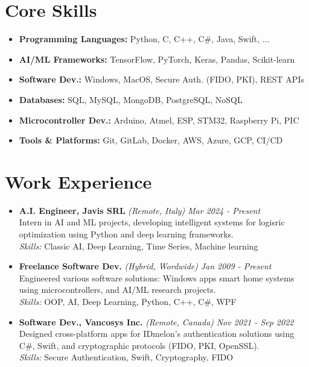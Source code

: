 \documentclass[a4paper]{article}
\begin{document}
\begin{paracol}{2}
\section*{Core Skills}
\begin{itemize}[left=0pt]
\setlength\itemsep{-0.3em}
    \item \textbf{Programming Languages:} Python, C, C++, C\#, Java, Swift, ...
    \item \textbf{AI/ML Frameworks:} TensorFlow, PyTorch, Keras, Pandas, Scikit-learn
    \item \textbf{Software Dev.:} Windows, MacOS, Secure Auth. (FIDO, PKI), REST APIs
    \item \textbf{Databases:} SQL, MySQL, MongoDB, PostgreSQL, NoSQL
    \item \textbf{Microcontroller Dev.:} Arduino, Atmel, ESP, STM32, Raspberry Pi, PIC
    \item \textbf{Tools \& Platforms:} Git, GitLab, Docker, AWS, Azure, GCP, CI/CD
\end{itemize}


\section*{Work Experience}

\begin{itemize}[left=0pt]
    \item \textbf{A.I. Engineer, Javis SRL} \textit{\fontsize{8}{0}\selectfont (Remote, Italy)} \hfill \textit{Mar 2024 - Present} \\
    Intern in AI and ML projects, developing intelligent systems for logisric optimization using Python and deep learning frameworks. 
    \\ \textit{Skills:} Classic AI, Deep Learning, Time Series, Machine learning

    \item \textbf{Freelance Software Dev.} \textit{\fontsize{8}{0}\selectfont (Hybrid, Wordwide)} \hfill \textit{Jan 2009 - Present} \\
    Engineered various software solutions: Windows apps smart home systems using microcontrollers, and AI/ML research projects.
     \\ \textit{Skills:} OOP, AI, Deep Learning, Python, C++, C\#, WPF

    \item \textbf{Software Dev., Vancosys Inc.} \textit{\fontsize{8}{0}\selectfont (Remote, Canada)} \hfill \textit{Nov 2021 - Sep 2022} \\
    Designed cross-platform apps for IDmelon’s authentication solutions using C\#, Swift, and cryptographic protocols (FIDO, PKI, OpenSSL). 
    \\ \textit{Skills:} Secure Authentication, Swift, Cryptography, FIDO
    

\end{itemize}
\end{paracol}
\end{document}

